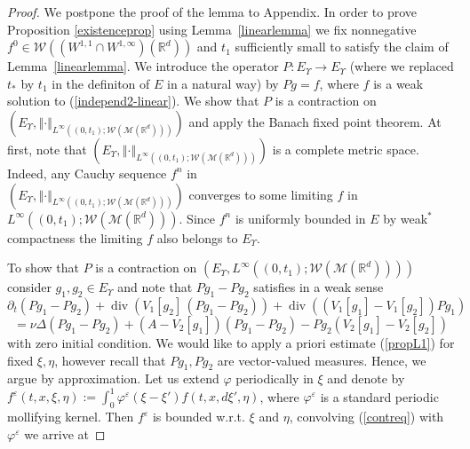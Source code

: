 \documentclass[10pt]{article}
\def\divv{\operatorname {div}}
\newcommand{\eqq}[2]{\begin{equation}  #1  \label{#2}\end{equation}    }
\newcommand*{\norm}[1]{\left\Vert{#1}\right\Vert}
\newcommand{\vf}{\varphi}
\newcommand{\ve}{\varepsilon}
\newcommand{\R}{\mathbb{R}}
\newcommand{\W}{\mathcal{W}}
\begin{document}
\begin{proof}
We postpone the proof of the lemma to Appendix. In order to prove Proposition \ref{existenceprop} using Lemma~\ref{linearlemma} we fix nonnegative $f^0 \in \W((W^{1,1}\cap W^{1,\infty})(\R^d))$ and $t_{1}$ sufficiently small to satisfy the claim of Lemma~\ref{linearlemma}. We introduce the operator $P:E_{\Upsilon} \rightarrow E_{\Upsilon}$ (where we replaced $t_*$ by $t_1$ in the definiton of $E$ in a natural way) by $Pg=f$, where $f$ is a weak solution to (\ref{independ2-linear}). We show that $P$ is a contraction on $(E_{\Upsilon},\norm{\cdot}_{L^{\infty}((0,t_{1});\W(\mathcal{M}(\R^d)))})$ and apply the Banach fixed point theorem. At first, note that $(E_{\Upsilon},\norm{\cdot}_{L^{\infty}((0,t_{1});\W(\mathcal{M}(\R^d)))})$ is a complete metric space. Indeed, any Cauchy sequence $f^n$ in \\$(E_{\Upsilon},\norm{\cdot}_{L^{\infty}((0,t_{1});\W(\mathcal{M}(\R^d)))})$ converges to some limiting $f$ in $L^{\infty}((0,t_{1});\W(\mathcal{M}(\R^d)))$. Since $f^n$ is uniformly bounded in $E$ by weak$^*$ compactness the limiting $f$ also belongs to $E_{\Upsilon}$.

 To show that $P$ is a contraction on $(E_{\Upsilon},L^{\infty}((0,t_{1});\W(\mathcal{M}(\R^d))))$ consider $g_1,g_2\in E_\Upsilon$ and note that $Pg_1 - Pg_2$ satisfies in a weak sense
\[
\partial_t(Pg_1-Pg_2)+\divv(V_1[g_2]\,(Pg_1-Pg_2))+\divv((V_1[g_1]-V_1[g_2])Pg_1)
\]
\eqq{
=\nu\Delta (Pg_1-Pg_2) + (A-V_2[g_1])(Pg_1-Pg_2) - Pg_2(V_2[g_1] - V_2[g_2])
}{contreq}
with zero initial condition. We would like to apply a priori estimate (\ref{propL1}) for fixed $\xi,\eta$, however recall that $Pg_1,Pg_2$ are vector-valued measures. Hence, we argue by approximation. Let us extend $\vf$ periodically in $\xi$ and denote by $f^\ve(t,x,\xi,\eta):=\int_0^1 \vf^\ve(\xi-\xi')f(t,x,d\xi',\eta)$, where $\vf^\ve$ is a standard periodic mollifying kernel. Then $f^\ve$ is bounded w.r.t. $\xi$ and $\eta$, convolving (\ref{contreq}) with $\vf^\ve$ we arrive at


\end{proof}
\end{document}
